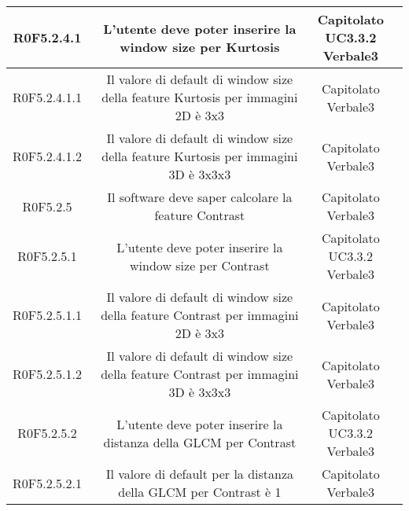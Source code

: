 \begin{center}
\begin{longtable}{|c|c|c|c|}
\hline
R0F5.2.4.1   & \parbox[t]{\larghezza}{L'utente deve poter inserire la window size per Kurtosis}  & \parbox[t]{\dimFonti}{ Capitolato \\ UC3.3.2 \\ Verbale3 \\} \\
\hline
R0F5.2.4.1.1   & \parbox[t]{\larghezza}{Il valore di default di window size della feature\glossario{} Kurtosis per immagini 2D è 3x3 }  & \parbox[t]{\dimFonti}{ Capitolato \\ Verbale3 \\} \\
\hline
R0F5.2.4.1.2   & \parbox[t]{\larghezza}{Il valore di default di window size della feature\glossario{} Kurtosis per immagini 3D è 3x3x3 }  & \parbox[t]{\dimFonti}{ Capitolato \\ Verbale3 \\} \\
\hline
R0F5.2.5   & \parbox[t]{\larghezza}{Il software deve saper calcolare la feature\glossario{} Contrast}  & \parbox[t]{\dimFonti}{ Capitolato \\ Verbale3 \\} \\
\hline
R0F5.2.5.1   & \parbox[t]{\larghezza}{L'utente deve poter inserire la window size per Contrast}  & \parbox[t]{\dimFonti}{ Capitolato \\ UC3.3.2 \\ Verbale3 \\} \\
\hline
R0F5.2.5.1.1   & \parbox[t]{\larghezza}{Il valore di default di window size della feature\glossario{} Contrast per immagini 2D è 3x3 }  & \parbox[t]{\dimFonti}{ Capitolato \\ Verbale3 \\} \\
\hline
R0F5.2.5.1.2   & \parbox[t]{\larghezza}{Il valore di default di window size della feature\glossario{} Contrast per immagini 3D è 3x3x3 }  & \parbox[t]{\dimFonti}{ Capitolato \\ Verbale3 \\} \\
\hline
R0F5.2.5.2   & \parbox[t]{\larghezza}{L'utente deve poter inserire la distanza della GLCM per Contrast}  & \parbox[t]{\dimFonti}{ Capitolato \\ UC3.3.2 \\ Verbale3 \\} \\
\hline
R0F5.2.5.2.1   & \parbox[t]{\larghezza}{Il valore di default per la distanza della GLCM per Contrast è 1}  & \parbox[t]{\dimFonti}{ Capitolato \\ Verbale3 \\} \\

\end{longtable}
\end{center}
